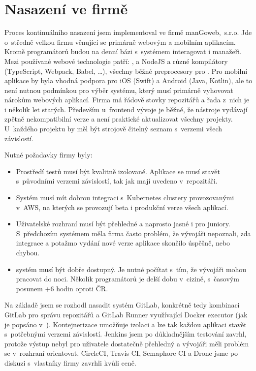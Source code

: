 \chapter{Nasazení ve firmě}
    Proces kontinuálního nasazení jsem implementoval ve firmě manGoweb,~s.r.o. Jde o~středně velkou firmu věnující se primárně webovým a mobilním aplikacím. Kromě programátorů budou na denní bázi s~\CI systémem interagovat i manažeři. Mezi používané webové technologie patří: ,  a NodeJS a různé kompilátory (TypeScript, Webpack, Babel, …), všechny běžné preprocesory pro . Pro mobilní aplikace by byla vhodná podpora pro iOS (Swift) a Android (Java, Kotlin), ale to není nutnou podmínkou pro výběr \CICD systému, který musí primárně vyhovovat nárokům webových aplikací. Firma má řádově stovky repozitářů a řada z~nich je i několik let starých. Především u~frontend vývoje je běžné, že nástroje vydávají zpětně nekompatibilní verze a není praktické aktualizovat všechny projekty. U~každého projektu by měl být strojově čitelný seznam s~verzemi všech závislostí.

    Nutné požadavky firmy byly:
    \begin{itemize}
        \item Prostředí testů musí být kvalitně izolované. Aplikace se musí stavět s~původními verzemi závislostí, tak jak mají uvedeno v~repozitáři.
        \item Systém musí mít dobrou integraci s~Kubernetes clustery provozovanými v~AWS, na kterých se provozují beta i produkční verze všech aplikací.
        \item Uživatelské rozhraní musí být přehledné a naprosto jasné i pro juniory. S~předchozím systémem měla firma často problém, že vývojáři nepoznali, zda integrace a potažmo vydání nové verze aplikace skončilo úspěšně, nebo chybou.
        \item \CICD systém musí být dobře dostupný. Je nutné počítat s~tím, že vývojáři mohou pracovat do noci. Několik programátorů je delší dobu v~cizině, s~časovým posunem +6 hodin oproti ČR\@.
    \end{itemize}

    Na základě  jsem se rozhodl nasadit \CICD systém GitLab, konkrétně tedy kombinaci GitLab pro správu repozitářů a GitLab Runner využívající Docker executor (jak je popsáno v~). Kontejnerizace umožňuje izolaci a lze tak každou aplikaci stavět s~potřebnými verzemi závislostí. Jenkins jsem po důkladnějším testování zavrhl, protože výstup nebyl pro uživatele dostatečně přehledný a vývojáři měli problém se v~rozhraní orientovat. CircleCI, Travis CI, Semaphore CI a Drone jsme po diskuzi s~vlastníky firmy zavrhli kvůli ceně.

